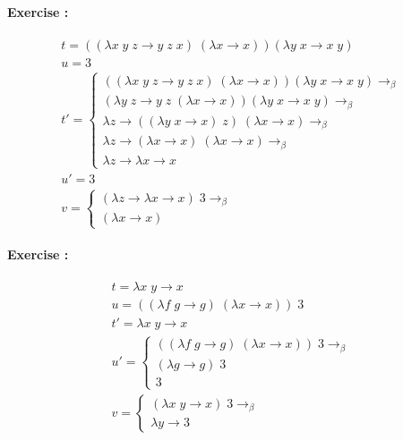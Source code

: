 \documentclass[10pt,a4paper]{article}
\newcounter{ExerciseCount}
\newcommand{\exercise}[1]{\noindent \textbf{Exercise \theExerciseCount:}
  
  \vspace{0.15cm}
 #1 \addtocounter{ExerciseCount}{1}
}
\begin{document}
\exercise{
  \begin{align*}
        \begin{array}{l}
           t = ((\lambda x \; y \; z \rightarrow y \; z \; x) \; (\lambda x \rightarrow x)) (\lambda y \; x \rightarrow x \; y)\\
           u = 3 \\
           t' = \left\lbrace
            \begin{array}{l}
            ((\lambda x \; y \; z \rightarrow y \; z \; x) \; (\lambda x \rightarrow x)) (\lambda y \; x \rightarrow x \; y) \rightarrow_\beta\\
            (\lambda y \; z \rightarrow y \; z \; (\lambda x \rightarrow x)) (\lambda y \; x \rightarrow x \; y) \rightarrow_\beta\\
            \lambda z \rightarrow ((\lambda y \; x \rightarrow x) \; z) \; (\lambda x \rightarrow x) \rightarrow_{\beta}\\
            \lambda z \rightarrow (\lambda x \rightarrow x) \; (\lambda x \rightarrow x) \rightarrow_{\beta}\\
            \lambda z \rightarrow \lambda x \rightarrow x
            \end{array} \right. \\
           u'= 3 \\
           v = \left \lbrace \begin{array}{l}
              (\lambda z \rightarrow \lambda x \rightarrow x) \; 3 \rightarrow_{\beta}\\
              (\lambda x \rightarrow x)
              \end{array} \right.
         \end{array}
        \end{align*}
}
\newpage
\exercise{
  \begin{align*}
    \begin{array}{l}
       t = \lambda x \; y \rightarrow x\\
       u = ((\lambda f \; g \rightarrow g) \; (\lambda x \rightarrow x)) \; 3 \\
       t' = \lambda x \; y \rightarrow x \\
       u'= \left\lbrace \begin{array}{l}
           ((\lambda f \; g \rightarrow g) \; (\lambda x \rightarrow x)) \; 3 \rightarrow_{\beta}\\
           (\lambda g \rightarrow g) \; 3 \\
           3
           \end{array} \right. \\
       v = \left \lbrace \begin{array}{l}
           (\lambda x \; y \rightarrow x) \; 3 \rightarrow_{\beta}\\
           \lambda y \rightarrow 3
          \end{array} \right.
     \end{array}
    \end{align*}
}
\end{document}
